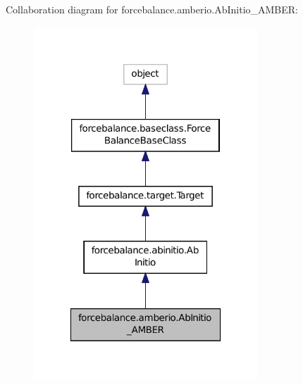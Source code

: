 Collaboration diagram for forcebalance.\-amberio.\-Ab\-Initio\-\_\-\-A\-M\-B\-E\-R\-:\nopagebreak
\begin{figure}[H]
\begin{center}
\leavevmode
\includegraphics[width=238pt]{classforcebalance_1_1amberio_1_1AbInitio__AMBER__coll__graph}
\end{center}
\end{figure}
